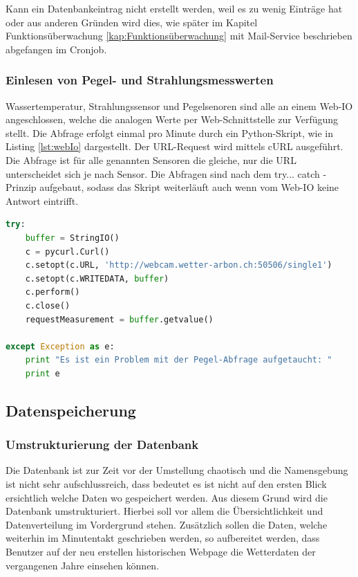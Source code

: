 Kann ein Datenbankeintrag nicht erstellt werden, weil es zu wenig Einträge hat oder aus anderen Gründen wird dies, wie später im Kapitel Funktionsüberwachung \ref{kap:Funktionsüberwachung} mit Mail-Service beschrieben abgefangen im Cronjob.  

\subsubsection{Einlesen von Pegel- und Strahlungsmesswerten}
Wassertemperatur, Strahlungssensor und Pegelsenoren sind alle an einem Web-IO angeschlossen, welche die analogen Werte per Web-Schnittstelle zur Verfügung stellt. Die Abfrage erfolgt einmal pro Minute durch ein Python-Skript, wie in Listing \ref{lst:webIo} dargestellt. Der URL-Request wird mittels cURL ausgeführt. Die Abfrage ist für alle genannten Sensoren die gleiche, nur die URL unterscheidet sich je nach Sensor. Die Abfragen sind nach dem try... catch - Prinzip aufgebaut, sodass das Skript weiterläuft auch wenn vom Web-IO keine Antwort eintrifft.

\begin{lstlisting}[label=lst:webIo,caption=Web-Abfrage des Pegel-Messwerts, language=python, style=py]
try:
    buffer = StringIO()
    c = pycurl.Curl()
    c.setopt(c.URL, 'http://webcam.wetter-arbon.ch:50506/single1')
    c.setopt(c.WRITEDATA, buffer)
    c.perform()
    c.close()
    requestMeasurement = buffer.getvalue()

except Exception as e:
    print "Es ist ein Problem mit der Pegel-Abfrage aufgetaucht: "
    print e
\end{lstlisting}


\subsection{Datenspeicherung}
\subsubsection{Umstrukturierung der Datenbank}
Die Datenbank ist zur Zeit vor der Umstellung chaotisch und die Namensgebung ist nicht sehr aufschlussreich, dass bedeutet es ist nicht auf den ersten Blick ersichtlich welche Daten wo gespeichert werden. Aus diesem Grund wird die Datenbank umstrukturiert. Hierbei soll vor allem die Übersichtlichkeit und Datenverteilung im Vordergrund stehen. Zusätzlich sollen die Daten, welche weiterhin im Minutentakt geschrieben werden, so aufbereitet werden, dass Benutzer auf der neu erstellen historischen Webpage die Wetterdaten der vergangenen Jahre einsehen können.

